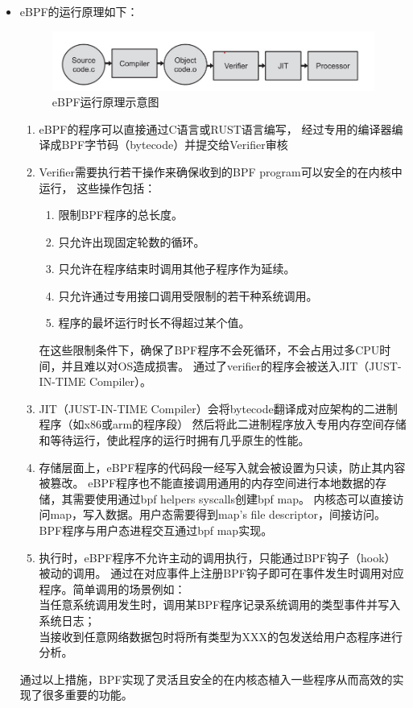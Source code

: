 \documentclass[AutoFakeBold,a4paper]{ctexart}
\begin{document}
\begin{itemize}
    \item eBPF的运行原理如下\cite{vieira2020fast}：
    \begin{figure}[H]
        \centering
        \includegraphics[width=0.9\columnwidth]{pic_1.jpg}
        \caption{eBPF运行原理示意图}
    \end{figure}
    \begin{enumerate}
        \item eBPF的程序可以直接通过C语言或RUST语言编写，
        经过专用的编译器编译成BPF字节码（bytecode）并提交给Verifier审核
        \item Verifier需要执行若干操作来确保收到的BPF program可以安全的在内核中运行，
        这些操作包括：
        \begin{enumerate}
            \item 限制BPF程序的总长度。
            \item 只允许出现固定轮数的循环。
            \item 只允许在程序结束时调用其他子程序作为延续。
            \item 只允许通过专用接口调用受限制的若干种系统调用。
            \item 程序的最坏运行时长不得超过某个值。
        \end{enumerate}
        在这些限制条件下，确保了BPF程序不会死循环，不会占用过多CPU时间，并且难以对OS造成损害。
        通过了verifier的程序会被送入JIT（JUST-IN-TIME Compiler）。
        \item JIT（JUST-IN-TIME Compiler）会将bytecode翻译成对应架构的二进制程序（如x86或arm的程序段）
        然后将此二进制程序放入专用内存空间存储和等待运行，使此程序的运行时拥有几乎原生的性能。
        \item 存储层面上，eBPF程序的代码段一经写入就会被设置为只读，防止其内容被篡改。
        eBPF程序也不能直接调用通用的内存空间进行本地数据的存储，其需要使用通过bpf helpers syscalls创建bpf map。
        内核态可以直接访问map，写入数据。用户态需要得到map's file descriptor，间接访问。
        BPF程序与用户态进程交互通过bpf map实现。
        
        \item 执行时，eBPF程序不允许主动的调用执行，只能通过BPF钩子（hook）被动的调用。
        通过在对应事件上注册BPF钩子即可在事件发生时调用对应程序。简单调用的场景例如：\\
        当任意系统调用发生时，调用某BPF程序记录系统调用的类型事件并写入系统日志；\\
        当接收到任意网络数据包时将所有类型为XXX的包发送给用户态程序进行分析。
    \end{enumerate}
    通过以上措施，BPF实现了灵活且安全的在内核态植入一些程序从而高效的实现了很多重要的功能。


\end{itemize}
\end{document}
